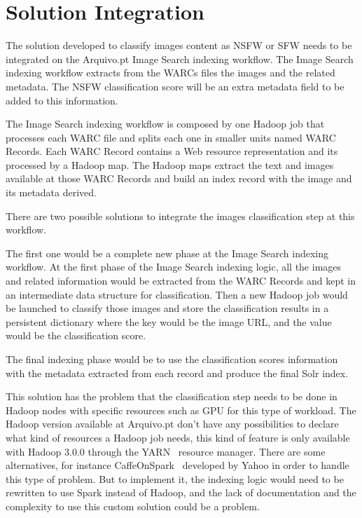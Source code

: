 \chapter{Solution Integration}

The solution developed to classify images content as NSFW or SFW needs to be integrated on the Arquivo.pt Image Search indexing workflow. 
The Image Search indexing workflow extracts from the WARCs files the images and the related metadata. The NSFW classification score will be an extra metadata field to be added to this information.

The Image Search indexing workflow is composed by one Hadoop job that processes each WARC file and splits each one in smaller units named WARC Records. Each WARC Record contains a Web resource representation and its processed by a Hadoop map. The Hadoop maps extract the text and images available at those WARC Records and build an index record with the image and its metadata derived.

There are two possible solutions to integrate the images classification step at this workflow. 

The first one would be a complete new phase at the Image Search indexing workflow. At the first phase of the Image Search indexing logic, all the images and related information would be extracted from the WARC Records and kept in an intermediate data structure for classification. Then a new Hadoop job would be launched to classify those images and store the classification results in a persistent dictionary where the key would be the image URL, and the value would be the classification score.

The final indexing phase would be to use the classification scores information with the metadata extracted from each record and produce the final Solr index.


This solution has the problem that the classification step needs to be done in Hadoop nodes with specific resources such as GPU for this type of workload. The Hadoop version available at Arquivo.pt don't have any possibilities to declare what kind of resources a Hadoop job needs, this kind of feature is only available with Hadoop 3.0.0 through the YARN~\cite{Vavilapalli:2013:AHY:2523616.2523633} resource manager. There are some alternatives, for instance CaffeOnSpark~\cite{caffeonspark} developed by Yahoo in order to handle this type of problem. But to implement it, the indexing logic would need to be rewritten to use Spark instead of Hadoop, and the lack of documentation and the complexity to use this custom solution could be a problem.

